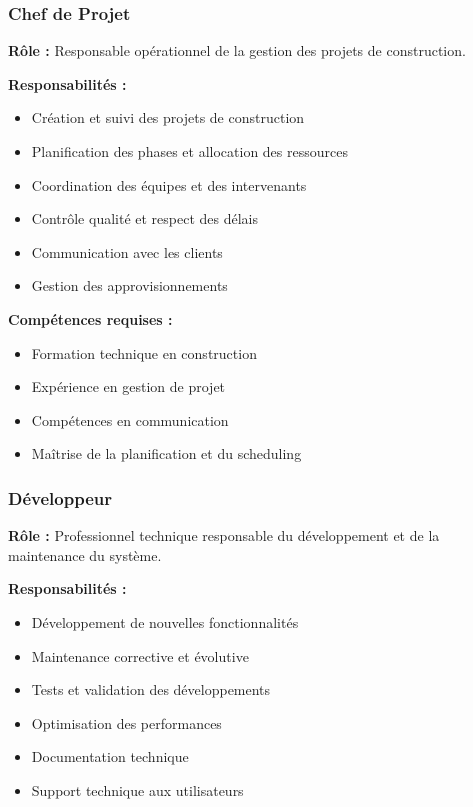 \subsubsection{Chef de Projet}

\textbf{Rôle :} Responsable opérationnel de la gestion des projets de construction.

\textbf{Responsabilités :}
\begin{itemize}
    \item Création et suivi des projets de construction
    \item Planification des phases et allocation des ressources
    \item Coordination des équipes et des intervenants
    \item Contrôle qualité et respect des délais
    \item Communication avec les clients
    \item Gestion des approvisionnements
\end{itemize}

\textbf{Compétences requises :}
\begin{itemize}
    \item Formation technique en construction
    \item Expérience en gestion de projet
    \item Compétences en communication
    \item Maîtrise de la planification et du scheduling
\end{itemize}

\subsubsection{Développeur}

\textbf{Rôle :} Professionnel technique responsable du développement et de la maintenance du système.

\textbf{Responsabilités :}
\begin{itemize}
    \item Développement de nouvelles fonctionnalités
    \item Maintenance corrective et évolutive
    \item Tests et validation des développements
    \item Optimisation des performances
    \item Documentation technique
    \item Support technique aux utilisateurs
\end{itemize}

